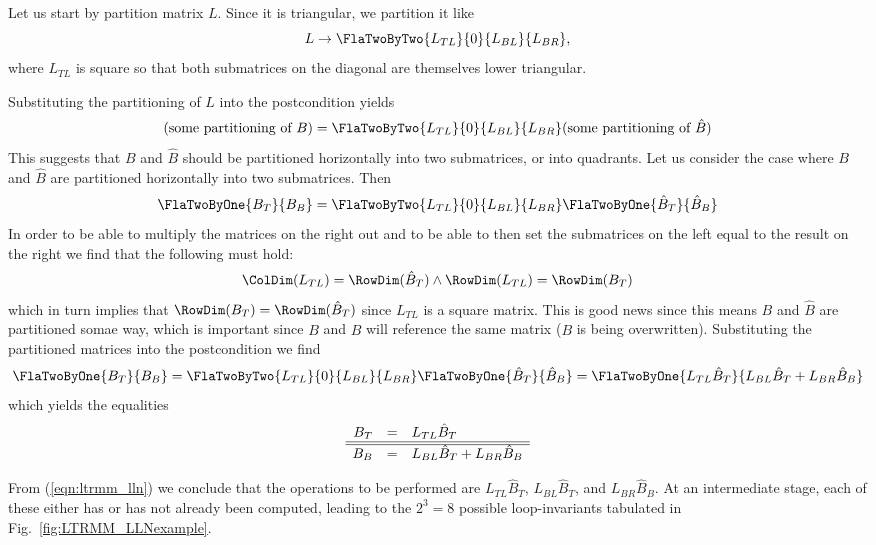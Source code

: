 Let us start by partition matrix $ L $.  Since it is triangular, we
partition it like
\[
L \rightarrow \FlaTwoByTwo{ L_{TL} }{ 0 }
                          { L_{BL} }{ L_{BR} },
\]
where $ L_{TL} $ is square so that both submatrices on the diagonal
are themselves lower triangular.

Substituting the partitioning of $ L $ into the postcondition yields
\[
( \mbox{some partitioning of }{B} )
= 
\FlaTwoByTwo{ L_{TL} }{ 0 }
            { L_{BL} }{ L_{BR} }
( \mbox{some partitioning of }\hat{B} )
\]
This suggests that $ B $ and $ \hat{B} $ should be partitioned
horizontally into two submatrices, or into quadrants.  Let us consider
the case where $ B $ and $ \hat{B} $ are partitioned horizontally into
two submatrices.  Then
\[
\FlaTwoByOne{ B_T }
            { B_B }
= 
\FlaTwoByTwo{ L_{TL} }{ 0 }
            { L_{BL} }{ L_{BR} }
\FlaTwoByOne{ \hat{B}_T }
            { \hat{B}_B }
\]
In order to be able to multiply the matrices on the right out and to
be able to then set the submatrices on the left equal to the result on
the right we find that the following must hold:
\[
\ColDim( L_{TL} ) = \RowDim( \hat{B}_T ) 
\wedge
\RowDim( L_{TL} ) = \RowDim( {B}_T ) 
\]
which in turn implies that $ \RowDim( B_T )= \RowDim( \hat{B}_T ) $
since $ L_{TL} $ is a square matrix.  This is good news since this
means $ B $ and $ \hat{B} $ are partitioned somae way, which is
important since $ B $ and $ \hat{B}$ will reference the same matrix ($
B $ is being overwritten).  Substituting the partitioned matrices into
the postcondition we find
\[
\FlaTwoByOne{ B_T }
            { B_B }
=
\FlaTwoByTwo{ L_{TL} }{ 0 }
            { L_{BL} }{ L_{BR} }
\FlaTwoByOne{ \hat{B}_T }
            { \hat{B}_B }
=
\FlaTwoByOne{ L_{TL} \hat{B}_T }
            { L_{BL} \hat{B}_T + L_{BR} \hat{B}_B }
\]
which yields the equalities
\begin{equation}
\label{eqn:ltrmm_lln}
\begin{array}{r c l}
B_T &=& L_{TL} \hat{B}_T \\ \hline \hline
B_B &=& L_{BL} \hat{B}_T + L_{BR} \hat{B}_B
\end{array}
\end{equation}



From (\ref{eqn:ltrmm_lln}) we conclude that the operations to be
performed are $ L_{TL} \hat{B}_T $, $ L_{BL} \hat{B}_T $, and $ L_{BR}
\hat{B}_B $.  At an intermediate stage, each of these either has or
has not already been computed, leading to the $ 2^3 = 8 $ possible
loop-invariants tabulated in Fig.~\ref{fig:LTRMM_LLNexample}.

